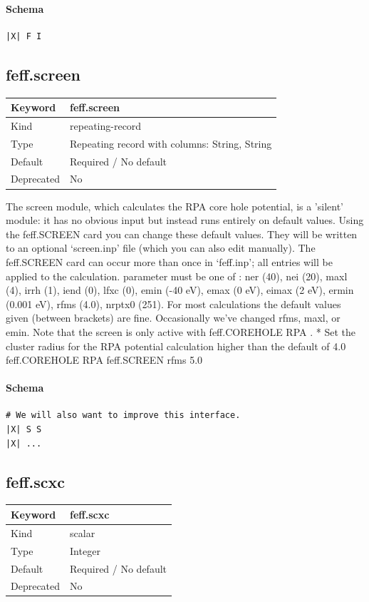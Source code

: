 \documentclass[11pt]{article}
\begin{document}
{{{{\paragraph{Schema}
\begin{Verbatim}
|X| F I
\end{Verbatim}

\subsection{feff.screen}
\label{kw:feff-screen}
\begin{longtable}{|p{1.5in}|p{4.5in}|}
\hline
Keyword & feff.screen \\
\hline
Kind & repeating-record \\
\hline
Type & Repeating record with columns: String, String \\
\hline
Default & Required / No default \\
\hline
Deprecated & No \\
\hline
\end{longtable}
 The screen module, which calculates the RPA core hole potential, is a ’silent’ module: it has
 no obvious input but instead runs entirely on default values. Using the feff.SCREEN card you
 can change these default values. They will be written to an optional ‘screen.inp’ file (which
 you can also edit manually). The feff.SCREEN card can occur more than once in ‘feff.inp’; all
 entries will be applied to the calculation. parameter must be one of : ner (40), nei (20), maxl
 (4), irrh (1), iend (0), lfxc (0), emin (-40 eV), emax (0 eV), eimax (2 eV), ermin (0.001 eV),
 rfms (4.0), nrptx0 (251). For most calculations the default values given (between brackets) are
 fine. Occasionally we’ve changed rfms, maxl, or emin. Note that the screen is only active with
 feff.COREHOLE{ RPA }.
 * Set the cluster radius for the RPA potential calculation higher than the default of 4.0
 feff.COREHOLE{ RPA }
 feff.SCREEN{ rfms 5.0 }

\paragraph{Schema}
\begin{Verbatim}
# We will also want to improve this interface.
|X| S S
|X| ...
\end{Verbatim}

\subsection{feff.scxc}
\label{kw:feff-scxc}
\begin{longtable}{|p{1.5in}|p{4.5in}|}
\hline
Keyword & feff.scxc \\
\hline
Kind & scalar \\
\hline
Type & Integer \\
\hline
Default & Required / No default \\
\hline
Deprecated & No \\
\hline
\end{longtable}
}}}}
\end{document}
